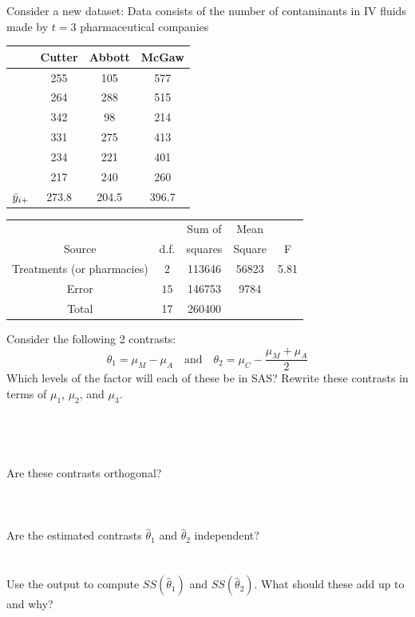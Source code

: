 \newpage
Consider a new dataset:  Data consists of the number of contaminants in IV fluids made by $t=3$ pharmaceutical companies
\begin{center}
\begin{tabular}{c|ccc|} \hline
&Cutter & Abbott & McGaw \\ \hline
&255 & 105 & 577 \\
&264 & 288 & 515 \\
&342 & 98 & 214 \\
&331 & 275 & 413 \\
&234 & 221 & 401 \\
&217 & 240 & 260 \\ \hline
$\bar{y}_{i +}$ &273.8 & 204.5 & 396.7 \\ \hline
\end{tabular}
\end{center}
\bigkn
\begin{center}
\begin{tabular}{|c|c|c|c|c|}  \hline
& & Sum of & Mean & \\
Source & d.f. & squares & Square & F \\ \hline
Treatments (or pharmacies) & $2$ & 113646 & 56823 & 5.81\\
Error & $15$ & 146753 & 9784 & \\
Total & 17 & 260400 & & \\ \hline
\end{tabular}
\end{center}
Consider the following 2 contrasts:
$$ \theta_1 = \mu_M-\mu_A \ \ \ \mbox{ and }\ \ \ \theta_2=\mu_C-\frac{\mu_M+\mu_A}{2}$$
Which levels of the factor will each of these be in SAS? Rewrite these contrasts in terms of $\mu_1$, $\mu_2$, and $\mu_3$.\\~\\~\\~\\~\\
Are these contrasts orthogonal?\\~\\~\\~\\
Are the estimated contrasts $\hat\theta_1$ and $\hat\theta_2$ independent?\\~\\~\\
Use the output to compute $SS(\hat\theta_1)$ and $SS(\hat\theta_2)$.  What should these add up to and why?

\newpage

